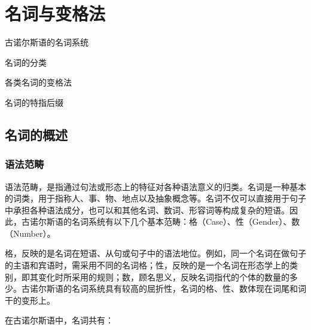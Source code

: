 \chapter{名词与变格法}
\label{名词与变格法}

\begin{introduction}[章节要点]
  \item 古诺尔斯语的名词系统
  \item 名词的分类
  \item 各类名词的变格法
  \item 名词的特指后缀
\end{introduction}

\section{名词的概述}
\label{名词的概述}
\subsection{语法范畴}
语法范畴，是指通过句法或形态上的特征对各种语法意义的归类。名词是一种基本的词类，用于指称人、事、物、地点以及抽象概念等。名词不仅可以直接用于句子中承担各种语法成分，也可以和其他名词、数词、形容词等构成复杂的短语。因此，古诺尔斯语的名词系统有以下几个基本范畴：格（Case）、性（Gender）、数（Number）。

格，反映的是名词在短语、从句或句子中的语法地位。例如，同一个名词在做句子的主语和宾语时，需采用不同的名词格；性，反映的是一个名词在形态学上的类别，即其变化时所采用的规则；数，顾名思义，反映名词指代的个体的数量的多少。古诺尔斯语的名词系统具有较高的屈折性，名词的格、性、数体现在词尾和词干的变形上。

在古诺尔斯语中，名词共有：

